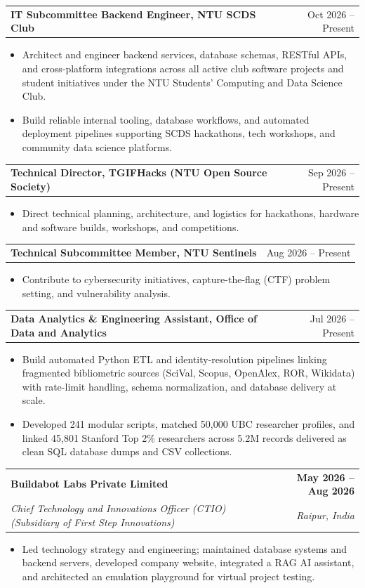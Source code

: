 \documentclass[10pt,a4paper]{article}
\makeatletter
\newcommand{\resumeItem}[1]{
  \item\small{#1}
}
\newcommand{\resumeSubheading}[4]{
  \vspace{3pt}
  \begin{tabular*}{\textwidth}[t]{l@{\extracolsep{\fill}}r}
    \textbf{#1} & \textbf{\small #2} \\
    \textit{\small#3} & \textit{\small #4} \\
  \end{tabular*}\vspace{0pt}
}
\newcommand{\resumeRole}[2]{
  \vspace{3pt}
  \begin{tabular*}{\textwidth}[t]{l@{\extracolsep{\fill}}r}
    \textbf{\small#1} & {\small #2} \\
  \end{tabular*}\vspace{0pt}
}
\makeatother
\begin{document}
  \resumeRole{IT Subcommittee Backend Engineer, NTU SCDS Club}{Oct 2026 -- Present}
  \begin{itemize}
    \resumeItem{Architect and engineer backend services, database schemas, RESTful APIs, and cross-platform integrations across all active club software projects and student initiatives under the NTU Students' Computing and Data Science Club.}
    \resumeItem{Build reliable internal tooling, database workflows, and automated deployment pipelines supporting SCDS hackathons, tech workshops, and community data science platforms.}
  \end{itemize}

  \resumeRole{Technical Director, TGIFHacks (NTU Open Source Society)}{Sep 2026 -- Present}
  \begin{itemize}
    \resumeItem{Direct technical planning, architecture, and logistics for hackathons, hardware and software builds, workshops, and competitions.}
  \end{itemize}

  \resumeRole{Technical Subcommittee Member, NTU Sentinels}{Aug 2026 -- Present}
  \begin{itemize}
    \resumeItem{Contribute to cybersecurity initiatives, capture-the-flag (CTF) problem setting, and vulnerability analysis.}
  \end{itemize}

  \resumeRole{Data Analytics \& Engineering Assistant, Office of Data and Analytics}{Jul 2026 -- Present}
  \begin{itemize}
    \resumeItem{Build automated Python ETL and identity-resolution pipelines linking fragmented bibliometric sources (SciVal, Scopus, OpenAlex, ROR, Wikidata) with rate-limit handling, schema normalization, and database delivery at scale.}
    \resumeItem{Developed 241 modular scripts, matched 50,000 UBC researcher profiles, and linked 45,801 Stanford Top 2\% researchers across 5.2M records delivered as clean SQL database dumps and CSV collections.}
  \end{itemize}

  \vspace{4pt}
  \resumeSubheading
    {Buildabot Labs Private Limited}{May 2026 -- Aug 2026}
    {Chief Technology and Innovations Officer (CTIO) (Subsidiary of First Step Innovations)}{Raipur, India}
    \begin{itemize}
      \resumeItem{Led technology strategy and engineering; maintained database systems and backend servers, developed company website, integrated a RAG AI assistant, and architected an emulation playground for virtual project testing.}
    \end{itemize}
\end{document}

